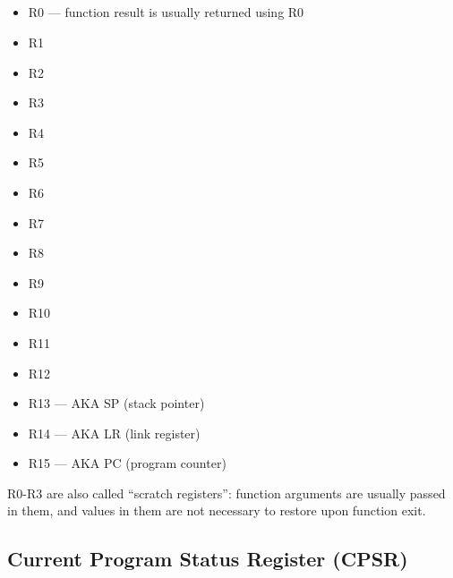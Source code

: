 \subsection{}

\begin{itemize}
	\item R0 --- 
		{function result is usually returned using R0}
	\item R1
	\item R2
	\item R3
	\item R4
	\item R5
	\item R6
	\item R7
	\item R8
	\item R9
	\item R10
	\item R11
	\item R12
	\item R13 --- \ac{AKA} SP (\gls{stack pointer})
	\item R14 --- \ac{AKA} LR (\gls{link register})
	\item R15 --- \ac{AKA} PC (program counter)
\end{itemize}

{R0-R3 are also called ``scratch registers'': function arguments are usually passed in them,
and values in them are not necessary to restore upon function exit}.

\subsection{Current Program Status Register (CPSR)}

